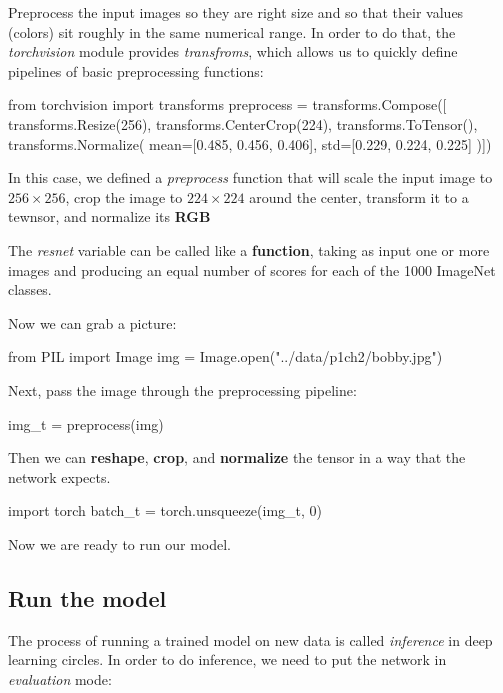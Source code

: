 Preprocess the input images so they are right size and so that their values (colors) sit roughly in the same numerical range. In order to do that, the \textsl{torchvision} module provides \textsl{transfroms}, which allows us to quickly define pipelines of basic preprocessing functions:

\begin{python}
from torchvision import transforms
preprocess = transforms.Compose([
        transforms.Resize(256),
        transforms.CenterCrop(224),
        transforms.ToTensor(),
        transforms.Normalize(
            mean=[0.485, 0.456, 0.406],
            std=[0.229, 0.224, 0.225]
        )])
\end{python}

In this case, we defined a \textsl{preprocess} function that will scale the input image to $256 \times 256$, crop the image to $224 \times 224$ around the center, transform it to a tewnsor, and normalize its \textbf{RGB}

The \textsl{resnet} variable can be called like a \textbf{function}, taking as input one or more images and producing an equal number of scores for each of the 1000 ImageNet classes.

Now we can grab a picture:

\begin{python}
from PIL import Image
img = Image.open("../data/p1ch2/bobby.jpg")
\end{python}

Next, pass the image through the preprocessing pipeline:

\begin{python}
img_t = preprocess(img)
\end{python}

Then we can \textbf{reshape}, \textbf{crop}, and \textbf{normalize} the tensor in a way that the network expects.

\begin{python}
import torch
batch_t = torch.unsqueeze(img_t, 0)
\end{python}

Now we are ready to run our model.

\subsection*{Run the model}

The process of running a trained model on new data is called \textsl{inference} in deep learning circles. In order to do inference, we need to put the network in \textsl{evaluation} mode:

